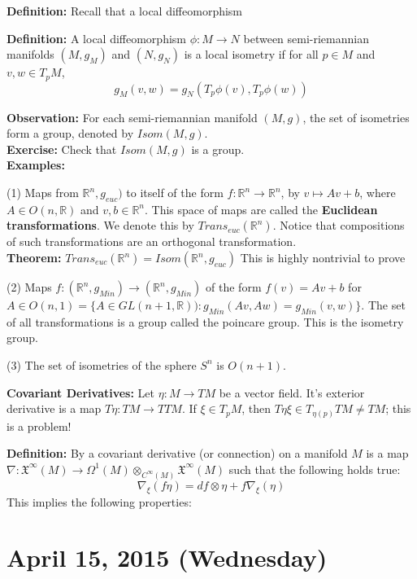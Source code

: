 \documentclass{article}
\begin{document}
\textbf{Definition:} Recall that a local diffeomorphism

\textbf{Definition:} A local diffeomorphism $\phi:M \to N$ between semi-riemannian manifolds $(M,g_M)$ and $(N,g_N)$ is a local isometry if for all $p \in M$ and $v,w \in T_pM$,
\[
g_M(v,w) = g_N(T_p\phi(v), T_p\phi(w))
\]

\textbf{Observation:} For each semi-riemannian manifold $(M, g)$, the set of isometries form a group, denoted by $Isom(M,g)$.\\
\textbf{Exercise:} Check that $Isom(M,g)$ is a group.\\
\textbf{Examples:}

(1) Maps from $\mathbb{R}^n, g_{euc})$ to itself of the form $f: \mathbb{R}^n \to \mathbb{R}^n$, by $v \mapsto Av + b$, where $A \in O(n, \mathbb{R})$ and $v, b \in \mathbb{R}^n$. This space of maps are called the \textbf{Euclidean transformations}. We denote this by $Trans_{euc}(\mathbb{R}^n)$. Notice that compositions of such transformations are an orthogonal transformation.\\
\textbf{Theorem:} $Trans_{euc}(\mathbb{R}^n) = Isom(\mathbb{R}^n, g_{euc})$ This is highly nontrivial to prove

(2) Maps $f:(\mathbb{R}^n, g_{Min}) \to (\mathbb{R}^n, g_{Min})$ of the form $f(v) = Av + b$ for $A \in O(n,1) = \{ A \in GL(n+1, \mathbb{R})) : g_{Min}(Av,Aw) = g_{Min}(v,w) \}$. The set of all transformations is a group called the poincare group. This is the isometry group.

(3) The set of isometries of the sphere $S^n$ is $O(n+1)$.

\textbf{Covariant Derivatives:} Let $\eta: M \to TM$ be a vector field. It's exterior derivative is a map $T\eta: TM \to TTM$. If $\xi \in T_pM$, then $T\eta \xi \in T_{\eta(p)}TM \neq TM$; this is a problem!

\textbf{Definition:} By a covariant derivative (or connection) on a manifold $M$ is a map $\nabla: \mathfrak{X}^\infty(M) \to \Omega^1(M) \otimes_{C^\infty (M)} \mathfrak{X}^\infty(M)$ such that the following holds true:
\[
\nabla_\xi(f\eta) = df \otimes \eta + f\nabla_\xi(\eta)
\]
This implies the following properties:

\section{April 15, 2015 (Wednesday)}
\end{document}
